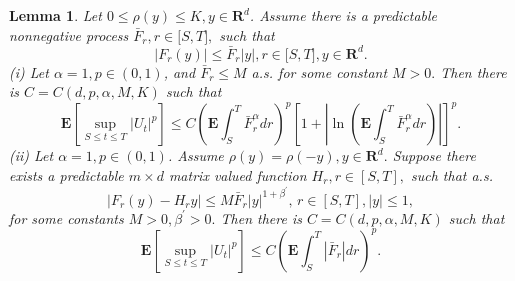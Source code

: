 \documentclass[11pt]{amsart}
\theoremstyle{plain}
\newtheorem{lemma}{Lemma}
\numberwithin{equation}{section}
\begin{document}
\begin{lemma}
\label{ele12}Let $0\leq \rho \left( y\right) \leq K,y\in \mathbf{R}^{d}$.
Assume there is a predictable nonnegative process $\bar{F}_{r},r\in \lbrack
S,T],$ such that\begin{equation*}
\left\vert F_{r}\left( y\right) \right\vert \leq \bar{F}_{r}\left\vert
y\right\vert ,r\in \lbrack S,T],y\in \mathbf{R}^{d}.
\end{equation*}(i) Let $\alpha =1,p\in \left( 0,1\right) $, and $\bar{F}_{r}\leq M$ a.s.
for some constant $M>0.$ Then there is $C=C\left( d,p,\alpha ,M,K\right) $
such that\begin{equation*}
\mathbf{E}\left[ \sup_{S\leq t\leq T}\left\vert U_{t}\right\vert ^{p}\right]
\leq C\left( \mathbf{E}\int_{S}^{T}\bar{F}_{r}^{\alpha }dr\right) ^{p}\left[
1+\left\vert \ln \left( \mathbf{E}\int_{S}^{T}\bar{F}_{r}^{\alpha }dr\right)
\right\vert \right] ^{p}.
\end{equation*}
(ii) Let $\alpha =1,p\in \left( 0,1\right) $. Assume $\rho \left( y\right)
=\rho \left( -y\right) ,y\in \mathbf{R}^{d}.$ Suppose there exists a
predictable $m\times d$ matrix valued function $H_{r},r\in \left[ S,T\right]
,$ such that a.s.\begin{equation*}
\left\vert F_{r}\left( y\right) -H_{r}y\right\vert \leq M\bar{F}_{r}\left\vert y\right\vert ^{1+\beta ^{\prime }}\text{, }r\in \left[ S,T\right] ,\left\vert y\right\vert \leq 1,
\end{equation*}for some constants $M>0,\beta ^{\prime }>0.$ Then there is $C=C\left(
d,p,\alpha ,M,K\right) $ such that 
\begin{equation*}
\mathbf{E}\left[ \sup_{S\leq t\leq T}\left\vert U_{t}\right\vert ^{p}\right]
\leq C\left( \mathbf{E}\int_{S}^{T}\left\vert \bar{F}_{r}\right\vert
dr\right) ^{p}.
\end{equation*}
\end{lemma}
\end{document}
